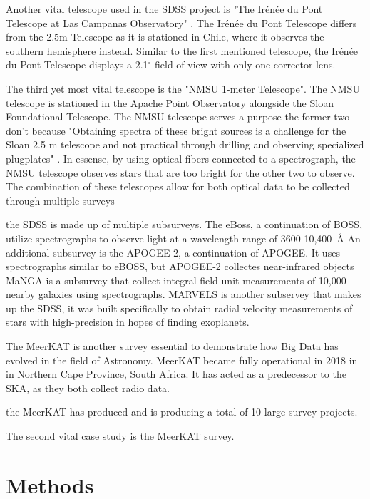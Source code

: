 \documentclass[preprint2,linenumbers, longauthor]{aastex631}
\begin{document}
Another vital telescope used in the SDSS project is "The Irénée du Pont Telescope at Las Campanas Observatory" . The Irénée du Pont Telescope differs from the 2.5m Telescope as it is stationed in Chile, where it observes the southern hemisphere instead. 
Similar to the first mentioned telescope, the Irénée du Pont Telescope displays a 2.1$^\circ$ field of view with only one corrector lens. \cite{bowenOpticalDesign40in1973}

The third yet most vital telescope is the "NMSU 1-meter Telescope". The NMSU telescope is stationed in the Apache Point Observatory alongside the Sloan Foundational Telescope. 
The NMSU telescope serves a purpose the former two don't because "Obtaining spectra of these bright sources is a challenge for the Sloan 2.5 m telescope and not practical through drilling and observing specialized plugplates" \cite{majewskiApachePointObservatory2017}. 
In essense, by using optical fibers connected to a spectrograph, the NMSU telescope observes stars that are too bright for the other two to observe. 
The combination of these telescopes allow for both optical data to be collected through multiple surveys \cite{holtzmanNMSU1Telescope2010}

the SDSS is made up of multiple subsurveys. The eBoss, a continuation of BOSS, utilize spectrographs to observe light at a wavelength range of 3600-10,400~\AA
An additional subsurvey is the APOGEE-2, a continuation of APOGEE. It uses spectrographs similar to eBOSS, but APOGEE-2 collectes near-infrared objects 
MaNGA is a subsurvey that collect integral field unit measurements of 10,000 nearby galaxies using spectrographs.
MARVELS is another subservey that makes up the SDSS, it was built specifically to obtain radial velocity measurements of stars with high-precision in hopes of finding exoplanets.

The MeerKAT is another survey essential to demonstrate how Big Data has evolved in the field of Astronomy.
MeerKAT became fully operational in 2018 in in Northern Cape Province, South Africa. It has acted as a predecessor to the SKA, as they both collect radio data. \cite{jonasMeerKATRadioTelescope2018}

the MeerKAT has produced and is producing a total of 10 large survey projects. 


The second vital case study is the MeerKAT survey. 
\section{Methods}


\end{document}
